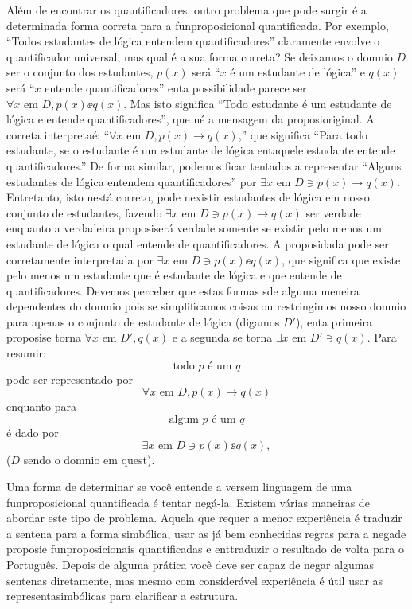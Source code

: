 Al\'em de encontrar os quantificadores, outro problema que pode surgir \'e a determina\cao da forma correta para a fun\cao proposicional quantificada. Por exemplo, ``Todos estudantes de l\'ogica entendem quantificadores'' claramente envolve o quantificador universal, mas qual \'e a sua forma correta? Se deixamos o dom\ih nio $D$ ser o conjunto dos estudantes, $p(x)$ ser\'a ``$x$ \'e um estudante de l\'ogica'' e $q(x)$ ser\'a ``$x$ entende quantificadores'' ent\ao a possibilidade parece ser $\forall x \textrm{ em } D, p(x)\ee q(x)$. Mas isto significa ``Todo estudante \'e um estudante de l\'ogica e entende quantificadores'', que n\ao \'e a mensagem da proposi\cao original. A correta interpreta\cao \'e: ``$\forall x \textrm{ em } D, p(x)\to q(x)$,'' que significa ``Para todo estudante, se o estudante \'e um estudante de l\'ogica ent\ao aquele estudante entende quantificadores.''  De forma similar, podemos ficar tentados a representar ``Alguns estudantes de l\'ogica entendem quantificadores'' por $\exists x \textrm{ em } D \ni p(x)\to q(x)$. Entretanto, isto n\ao est\'a correto, pode n\ao existir estudantes de l\'ogica em nosso conjunto de estudantes, fazendo $\exists x \textrm{ em } D \ni p(x)\to q(x)$ ser verdade enquanto a verdadeira proposi\cao ser\'a verdade somente se existir pelo menos um estudante de l\'ogica o qual entende de quantificadores. A proposi\cao dada pode ser corretamente interpretada por $\exists x \textrm{ em } D \ni p(x)\ee q(x)$, que significa que existe pelo menos um estudante que \'e estudante de l\'ogica e que entende de quantificadores. Devemos perceber que estas formas s\ao de alguma meneira dependentes do dom\ih nio pois se simplificamos coisas ou restringimos nosso dom\ih nio para apenas o conjunto de estudante de l\'ogica (digamos $D'$), ent\ao a primeira proposi\cao se torna $\forall x \textrm{ em } D', q(x)$ e a segunda se torna $\exists x \textrm{ em } D' \ni q(x)$. Para resumir:
\[
\textrm{todo $p$ \'e um $q$}
\]
pode ser representado por
\[
\forall x \textrm{ em } D, p(x)\to q(x)
\]
enquanto para
\[
\textrm{algum $p$ \'e um $q$}
\]
\'e dado por
\[
\exists x \textrm{ em } D \ni p(x)\ee q(x),
\]
($D$ sendo o dom\ih nio em quest\aoi).

Uma forma de determinar se voc\^e entende a vers\ao em linguagem de uma fun\cao proposicional quantificada \'e tentar neg\'a-la. Existem v\'arias maneiras de abordar este tipo de problema. Aquela que requer a menor experi\^encia \'e traduzir a senten\cc a para a forma simb\'olica, usar as j\'a bem conhecidas regras para a nega\cao de proposi\cao e fun\coes proposicionais quantificadas e ent\ao traduzir o resultado de volta para o Portugu\^es. Depois de alguma pr\'atica voc\^e deve ser capaz de negar algumas senten\cc as diretamente, mas mesmo com consider\'avel experi\^encia \'e \'util usar as representa\coes simb\'olicas para clarificar a estrutura.

